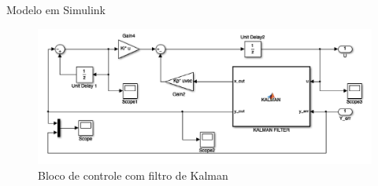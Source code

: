 \documentclass[10pt]{beamer}
\begin{document}
\begin{frame}[fragile]{Modelo em Simulink}
	\begin{figure}[!ht]
	\centering
	\includegraphics[width=0.9\linewidth]{figures/resultados/simulink/controle}
	\caption{Bloco de controle com filtro de Kalman\label{blocoControle}}
\end{figure}
\end{frame}
\end{document}
